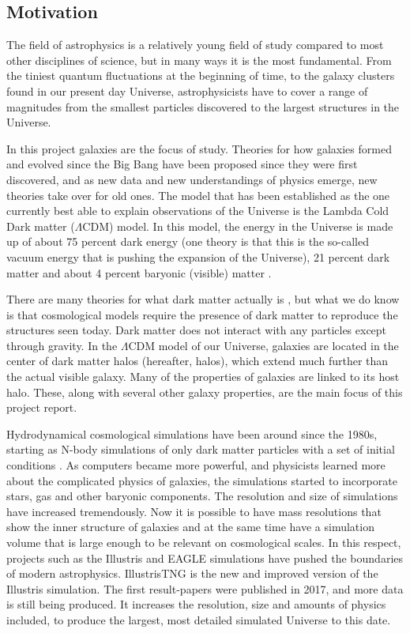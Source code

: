 
\noindent
\subsection{Motivation}
The field of astrophysics is a relatively young field of study compared to most other disciplines of science, but in many ways it is the most fundamental. From the tiniest quantum fluctuations at the beginning of time, to the galaxy clusters found in our present day Universe, astrophysicists have to cover a range of magnitudes from the smallest particles discovered to the largest structures in the Universe. 

In this project galaxies are the focus of study. Theories for how galaxies formed and evolved since the Big Bang have been proposed since they were first discovered, and as new data and new understandings of physics emerge, new theories take over for old ones. The model that has been established as the one currently best able to explain observations of the Universe is the Lambda Cold Dark matter ($\Lambda$CDM) model. In this model, the energy in the Universe is made up of about 75 percent dark energy (one theory is that this is the so-called vacuum energy that is pushing the expansion of the Universe), 21 percent dark matter and about 4 percent baryonic (visible) matter \parencite{Planck2016}. 

There are many theories for what dark matter actually is \parencite[see e.g.,][]{Boveia2018}, but what we do know is that cosmological models require the presence of dark matter to reproduce the structures seen today. Dark matter does not interact with any particles except through gravity. In the $\Lambda$CDM model of our Universe, galaxies are located in the center of dark matter halos (hereafter, halos), which extend much further than the actual visible galaxy. Many of the properties of galaxies are linked to its host halo. These, along with several other galaxy properties, are the main focus of this project report.

Hydrodynamical cosmological simulations have been around since the 1980s, starting as N-body simulations of only dark matter particles with a set of initial conditions \parencite{Frenk1983}. As computers became more powerful, and physicists learned more about the complicated physics of galaxies, the simulations started to incorporate stars, gas and other baryonic components. The resolution and size of simulations have increased tremendously. Now it is possible to have mass resolutions that show the inner structure of galaxies and at the same time have a simulation volume that is large enough to be relevant on cosmological scales. In this respect, projects such as the Illustris and EAGLE simulations have pushed the boundaries of modern astrophysics. IllustrisTNG is the new and improved version of the Illustris simulation. The first result-papers were published in 2017, and more data is still being produced. It increases the resolution, size and amounts of physics included, to produce the largest, most detailed simulated Universe to this date. 

